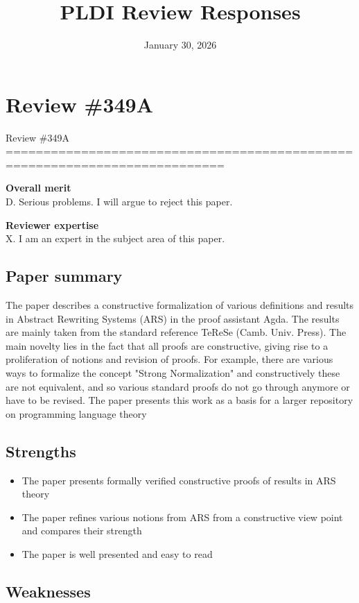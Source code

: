\documentclass[11pt]{article}
\title{PLDI Review Responses}
\date{January 30, 2026}
\begin{document}
\maketitle

\section*{Review \#349A}

Review \#349A
===========================================================================


\textbf{Overall merit}
\\
D. Serious problems. I will argue to reject this paper.

\textbf{Reviewer expertise}
\\
X. I am an expert in the subject area of this paper.

\subsection*{Paper summary}

The paper describes a constructive formalization of various definitions
and results in Abstract Rewriting Systems (ARS) in the proof assistant
Agda. The results are mainly taken from the standard reference TeReSe
(Camb. Univ. Press). The main novelty lies in the fact that all proofs
are constructive, giving rise to a proliferation of notions and
revision of proofs. For example, there are various ways to formalize
the concept "Strong Normalization" and constructively these are not
equivalent, and so various standard proofs do not go through anymore
or have to be revised.
The paper presents this work as a basis for a larger repository on
programming language theory

\subsection*{Strengths}
\begin{itemize}
	\item  The paper presents formally verified constructive proofs of results in ARS theory
	\item The paper refines various notions from ARS from a constructive view point and compares their strength
	\item The paper is well presented and easy to read

\end{itemize}

\subsection*{Weaknesses}
\end{document}
